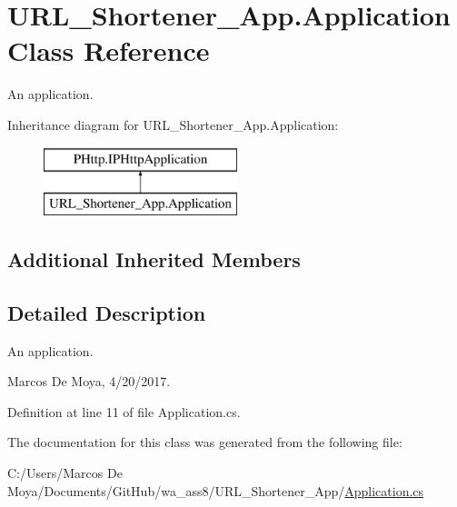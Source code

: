 \hypertarget{class_u_r_l___shortener___app_1_1_application}{}\section{U\+R\+L\+\_\+\+Shortener\+\_\+\+App.\+Application Class Reference}
\label{class_u_r_l___shortener___app_1_1_application}


An application.  


Inheritance diagram for U\+R\+L\+\_\+\+Shortener\+\_\+\+App.\+Application\+:\begin{figure}[H]
\begin{center}
\leavevmode
\includegraphics[height=2.000000cm]{class_u_r_l___shortener___app_1_1_application}
\end{center}
\end{figure}
\subsection*{Additional Inherited Members}


\subsection{Detailed Description}
An application. 

Marcos De Moya, 4/20/2017. 

Definition at line 11 of file Application.\+cs.



The documentation for this class was generated from the following file\+:\begin{DoxyCompactItemize}
\item 
C\+:/\+Users/\+Marcos De Moya/\+Documents/\+Git\+Hub/wa\+\_\+ass8/\+U\+R\+L\+\_\+\+Shortener\+\_\+\+App/\hyperlink{_u_r_l___shortener___app_2_application_8cs}{Application.\+cs}\end{DoxyCompactItemize}
